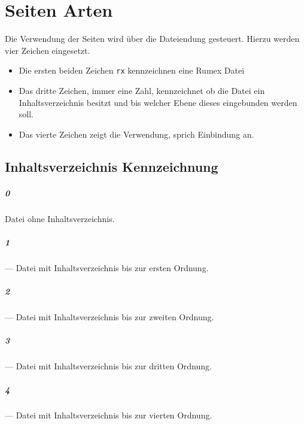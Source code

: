 \label{kap:seitenarten}
\chapter{Seiten Arten}

Die Verwendung der Seiten wird über die
Dateiendung gesteuert.
Hierzu werden vier Zeichen eingesetzt.



\begin{itemize}
\item Die ersten beiden Zeichen \verb|rx| kennzeichnen eine Rumex Datei
\item Das dritte Zeichen, immer eine Zahl, kennzeichnet ob die Datei ein
Inhaltsverzeichnis besitzt und bis welcher Ebene dieses eingebunden werden
soll. 
\item Das vierte Zeichen zeigt die Verwendung, sprich Einbindung an.
\end{itemize}





\label{sec:inhaltsverzeichnis-kennzeichnung}
\section{Inhaltsverzeichnis Kennzeichnung}

\paragraph{0} Datei ohne Inhaltsverzeichnis.

\paragraph{1} --- Datei mit Inhaltsverzeichnis bis zur ersten Ordnung.

\paragraph{2} --- Datei mit Inhaltsverzeichnis bis zur zweiten Ordnung.

\paragraph{3} --- Datei mit Inhaltsverzeichnis bis zur dritten Ordnung.

\paragraph{4} --- Datei mit Inhaltsverzeichnis bis zur vierten Ordnung.

